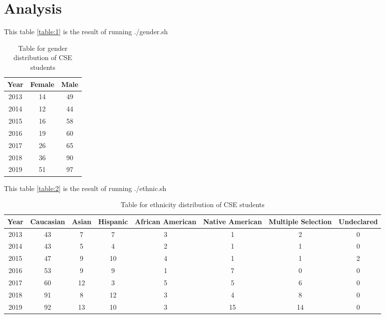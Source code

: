 \documentclass[letterpaper]{article}
\begin{document}
\section*{Analysis}

This table \ref{table:1} is the result of running ./gender.sh

\begin{table}[h!]
\centering
\begin{tabular}{||c c c||}
 \hline
 Year & Female & Male \\ [0.5ex]
 \hline\hline
 2013 & 14 & 49 \\
 2014 & 12 & 44 \\
 2015 & 16 & 58 \\
 2016 & 19 & 60 \\
 2017 & 26 & 65 \\
 2018 & 36 & 90 \\
 2019 & 51 & 97 \\ [1ex]
 \hline
\end{tabular}
\caption{Table for gender distribution of CSE students}
\label{table:gender}
\end{table}

This table \ref{table:2} is the result of running ./ethnic.sh

\begin{table}[h!]
\centering
\begin{tabular}{||c c c c c c c c||}
 \hline
 Year & Caucasian & Asian & Hispanic & African American & Native American & Multiple Selection & Undeclared \\ [0.5ex]
 \hline\hline
 2013 & 43 & 7 & 7 & 3 & 1 & 2 & 0 \\
 2014 & 43 & 5 & 4 & 2 & 1 & 1 & 0 \\
 2015 & 47 & 9 & 10 & 4 & 1 & 1 & 2 \\
 2016 & 53 & 9 & 9 & 1 & 7 & 0 & 0 \\
 2017 & 60 & 12 & 3 & 5 & 5 & 6 & 0 \\
 2018 & 91 & 8 & 12 & 3 & 4 & 8 & 0 \\
 2019 & 92 & 13 & 10 & 3 & 15 & 14 & 0 \\ [1ex]
 \hline
\end{tabular}
\caption{Table for ethnicity distribution of CSE students}
\label{table:ethnic}
\end{table}


\paragraph{}
\end{document}
